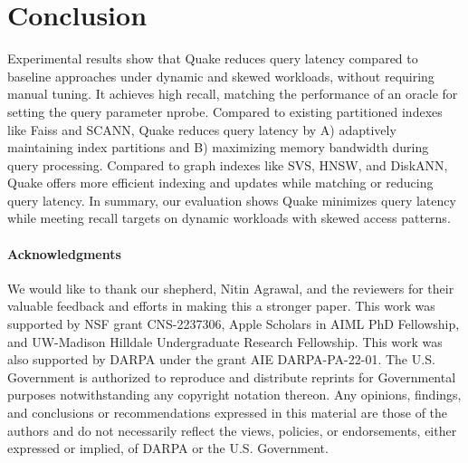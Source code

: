 \section{Conclusion}
Experimental results show that Quake reduces query latency compared to baseline approaches under dynamic and skewed workloads, without requiring manual tuning. It achieves high recall, matching the performance of an oracle for setting the query parameter nprobe. Compared to existing partitioned indexes like Faiss and SCANN, Quake reduces query latency by A) adaptively maintaining index partitions and B) maximizing memory bandwidth during query processing. Compared to graph indexes like SVS, HNSW, and DiskANN, Quake offers more efficient indexing and updates while matching or reducing query latency. In summary, our evaluation shows Quake minimizes query latency while meeting recall targets on dynamic workloads with skewed access patterns.

\paragraph{Acknowledgments}
We would like to thank our shepherd, Nitin Agrawal, and the reviewers for their valuable feedback and efforts in making this a stronger paper. This work was supported by NSF grant CNS-2237306, Apple Scholars in AIML PhD Fellowship, and UW-Madison Hilldale Undergraduate Research Fellowship. This work was also supported by DARPA under the grant AIE DARPA-PA-22-01. The U.S. Government is authorized to reproduce and distribute reprints for Governmental purposes notwithstanding any copyright notation thereon. Any opinions, findings, and conclusions or recommendations expressed in this material are those of the authors and do not necessarily reflect the views, policies, or endorsements, either expressed or implied, of DARPA or the U.S. Government.